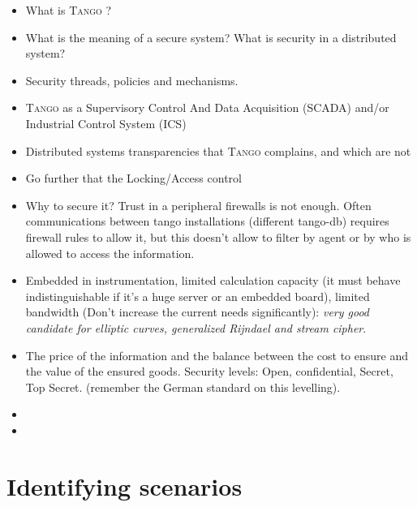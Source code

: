 \documentclass[10pt,a4paper,twoside]{llncs}
\newcommand{\tango}{\textsc{Tango} }
\begin{document}
\begin{itemize}
 \item What is \tango?
 \item What is the meaning of a secure system? What is security in a distributed system?
 \item Security threads, policies and mechanisms.
 \item \tango as a Supervisory Control And Data Acquisition (SCADA) and/or Industrial Control System (ICS)
 \item Distributed systems transparencies \cite{TanenbaumDistr} that \tango complains, and which are not
 \item Go further that the Locking/Access control
 \item Why to secure it? Trust in a peripheral firewalls is not enough. Often communications between tango installations (different tango-db) requires firewall rules to allow it, but this doesn't allow to filter by agent or by who is allowed to access the information.
 \item Embedded in instrumentation, limited calculation capacity (it must behave indistinguishable if it's a huge server or an embedded board), limited bandwidth (Don't increase the current needs significantly): \emph{very good candidate for elliptic curves, generalized Rijndael and stream cipher}.
 \item The price of the information and the balance between the cost to ensure and the value of the ensured goods. Security levels: Open, confidential, Secret, Top Secret. (remember the German standard on this levelling).
 \item 
 \item 
\end{itemize}

%
\section{Identifying scenarios \label{sec:scenarios}}
\end{document}
